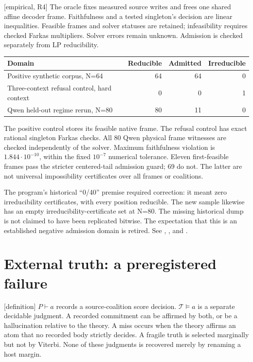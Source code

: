 \documentclass[11pt]{article}
\newcommand{\status}[1]{\textsf{[#1]}}
\begin{document}
\status{empirical, R4} The oracle fixes measured source writes and frees
one shared affine decoder frame. Faithfulness and a tested singleton's
decision are linear inequalities. Feasible frames and solver statuses are
retained; infeasibility requires checked Farkas multipliers. Solver errors
remain unknown. Admission is checked separately from LP reducibility.
\begin{center}
\begin{tabular}{lrrr}
\toprule
Domain & Reducible & Admitted & Irreducible\\
\midrule
Positive synthetic corpus, N=64 & 64 & 64 & 0\\
Three-context refusal control, hard context & 0 & 0 & 1\\
Qwen held-out regime rerun, N=80 & 80 & 11 & 0\\
\bottomrule
\end{tabular}
\end{center}
The positive control stores its feasible native frame. The refusal control
has exact rational singleton Farkas checks. All 80 Qwen physical frame
witnesses are checked independently of the solver. Maximum faithfulness
violation is $1.844\cdot10^{-10}$, within the fixed $10^{-7}$ numerical
tolerance. Eleven first-feasible frames pass the stricter centered-tail
admission guard; 69 do not. The latter are not universal impossibility
certificates over all frames or coalitions.

The program's historical ``0/40'' premise required correction: it meant
zero irreducibility certificates, with every position reducible. The new
sample likewise has an empty irreducibility-certificate set at N=80. The
missing historical dump is not claimed to have been replicated bitwise.
The expectation that this is an established negative admission domain is
retired. See ,
, and .

\section{External truth: a preregistered failure}

\status{definition} $P\vdash a$ records a source-coalition score decision.
$\mathcal T\models a$ is a separate decidable judgment. A recorded
commitment can be affirmed by both, or be a hallucination relative to the
theory. A miss occurs when the theory affirms an atom that no recorded body
strictly decides. A fragile truth is selected marginally but not by Viterbi.
None of these judgments is recovered merely by renaming a host margin.
\end{document}

